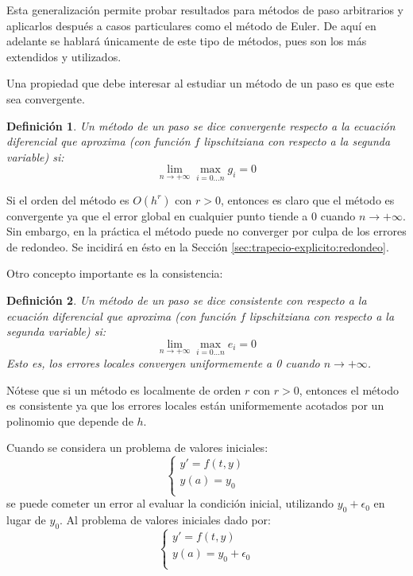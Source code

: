 \documentclass{article}
\theoremstyle{theorem-style}  %
\theoremstyle{definition-style}
\newtheorem{definition}{Definición}[section]
\theoremstyle{example-style}
\begin{document}
    Esta generalización permite probar resultados para métodos de paso arbitrarios y aplicarlos después a casos particulares como el método de Euler. De aquí en adelante se hablará únicamente de este tipo de métodos, pues son los más extendidos y utilizados.

    Una propiedad que debe interesar al estudiar un método de un paso es que este sea convergente.

	\begin{definition}
		Un método de un paso se dice convergente respecto a la ecuación diferencial que aproxima (con función $f$ lipschitziana con respecto a la segunda variable) si:
		$$ \lim_{n \rightarrow +\infty} \max_{i = 0 \ldots n} g_i = 0 $$
	\end{definition}

	Si el orden del método es $O(h^r)$ con $r > 0$, entonces es claro que el método es convergente ya que el error global en cualquier punto tiende a $0$ cuando $n \rightarrow +\infty$. Sin embargo, en la práctica el método puede no converger por culpa de los errores de redondeo. Se incidirá en ésto en la Sección \ref{sec:trapecio-explicito:redondeo}.

    Otro concepto importante es la consistencia:
    \begin{definition}
    	Un método de un paso se dice consistente con respecto a la ecuación diferencial que aproxima (con función $f$ lipschitziana con respecto a la segunda variable) si:
    	$$ \lim_{n \rightarrow +\infty} \max_{i = 0 \ldots n} e_i = 0 $$
    	Esto es, los errores locales convergen uniformemente a 0 cuando $n \rightarrow +\infty$.
    \end{definition}

    Nótese que si un método es localmente de orden $r$ con $r > 0$, entonces el método es consistente ya que los errores locales están uniformemente acotados por un polinomio que depende de $h$.

    Cuando se considera un problema de valores iniciales:
     \begin{equation*}
		\begin{cases}
			y' = f(t, y) \\
			y(a) = y_0 \\
		\end{cases}
	\end{equation*}
se puede cometer un error al evaluar la condición inicial, utilizando $y_0 + \epsilon_0$ en lugar de $y_0$. Al problema de valores iniciales dado por:
    \begin{equation*}
		\begin{cases}
			y' = f(t, y) \\
			y(a) = y_0 + \epsilon_0 \\
		\end{cases}
	\end{equation*}
\end{document}
